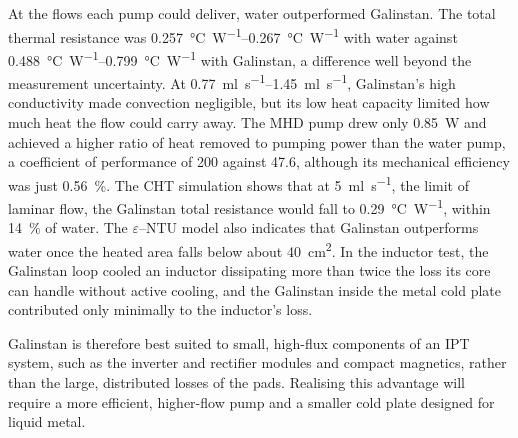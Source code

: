 At the flows each pump could deliver, water outperformed Galinstan. The total
thermal resistance was \SIrange{0.257}{0.267}{\celsius\per\watt} with water
against \SIrange{0.488}{0.799}{\celsius\per\watt} with Galinstan, a difference
well beyond the measurement uncertainty. At
\SIrange{0.77}{1.45}{\milli\litre\per\second}, Galinstan's high conductivity made
convection negligible, but its low heat capacity limited how much heat the flow
could carry away. The MHD pump drew only \SI{0.85}{\watt} and achieved a higher
ratio of heat removed to pumping power than the water pump, a coefficient of
performance of 200 against 47.6, although its mechanical efficiency was just
\SI{0.56}{\percent}. The CHT simulation shows
that at \SI{5}{\milli\litre\per\second}, the limit of laminar flow, the Galinstan
total resistance would fall to \SI{0.29}{\celsius\per\watt}, within
\SI{14}{\percent} of water. The $\varepsilon$--NTU model also indicates that
Galinstan outperforms water once the heated area falls below about
\SI{40}{\centi\metre\squared}. In the inductor test, the Galinstan loop cooled an
inductor dissipating more than twice the loss its core can handle without active
cooling, and the Galinstan inside the metal cold plate contributed only
minimally to the inductor's loss.

Galinstan is therefore best suited to small, high-flux components of an IPT
system, such as the inverter and rectifier modules and compact magnetics, rather
than the large, distributed losses of the pads. Realising this advantage will
require a more efficient, higher-flow pump and a smaller cold plate designed for
liquid metal.

\endgroup
\clearpage
